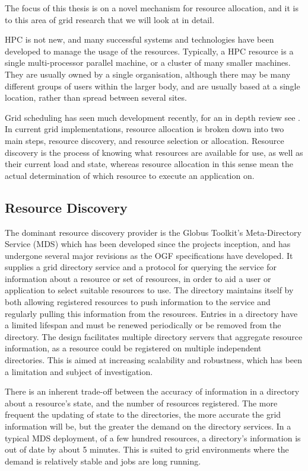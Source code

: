 The focus of this thesis is on a novel mechanism for resource allocation, and it
is to this area of grid research that we will look at in detail.

HPC is not new, and many successful systems and technologies have been
developed to manage the usage of the resources. Typically, a HPC resource is a
single multi-processor parallel machine, or a cluster of many smaller machines.
They are usually owned by a single organisation, although there may be many
different groups of users within the larger body, and are usually based at a
single location, rather than spread between several sites. 

Grid scheduling has seen much development recently, for an in depth review see
\cite{grid-nabrzyski04-review}.  In current grid implementations, resource allocation is broken
down into two main steps, resource discovery, and resource selection or
allocation. Resource discovery is the process of knowing what resources are
available for use, as well as their current load and state, whereas resource
allocation in this sense mean the actual determination of which resource to
execute an application on.

\subsection{Resource Discovery}

The dominant resource discovery provider is the Globus Toolkit's Meta-Directory
Service (MDS) \cite{grid-czajkowski01-mds2} which has been developed since the
projects inception, and has undergone several major revisions as the OGF
specifications have developed. It supplies a grid directory service and a
protocol for querying the service for information about a resource or set of
resources, in order to aid a user or application to select suitable resources
to use. The directory maintains itself by both allowing registered resources to
push information to the service and regularly pulling this information from the
resources. Entries in a directory have a limited lifespan and must be renewed
periodically or be removed from the directory. The design facilitates multiple
directory servers that aggregate resource information, as a resource could be
registered on multiple independent directories. This is aimed at increasing
scalability and robustness, which has been a limitation and subject of
investigation\cite{grid-iamnitchi01-agent}.

There is an inherent trade-off between the accuracy of information in a
directory about a resource's state, and the number of resources registered. The
more frequent the updating of state to the directories, the more accurate the
grid information will be, but the greater the demand on the directory services.
In a typical MDS deployment, of a few hundred resources, a directory's
information is out of date by about 5 minutes. This is suited to grid
environments where the demand is relatively stable and jobs are long running.

